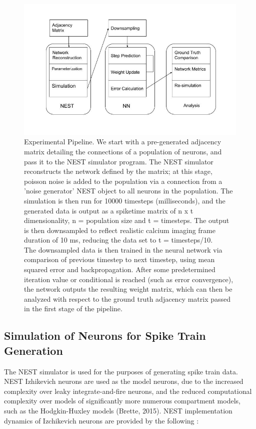\documentclass[11pt]{article}
\begin{document}
\begin{figure}[H]
\centering
	\includegraphics[scale=0.4]{./Figures/SPROJModel.jpg}
	\caption{Experimental Pipeline. We start with a pre-generated adjacency matrix detailing the connections of a population of neurons, and pass it to the NEST simulator program. The NEST simulator reconstructs the network defined by the matrix; at this stage, poisson noise is added to the population via a connection from a 'noise generator' NEST object to all neurons in the population. The simulation is then run for 10000 timesteps (milliseconds), and the generated data is output as a spiketime matrix of n x t dimensionality, n = population size and t = timesteps. The output is then downsampled to reflect realistic calcium imaging frame duration of 10 ms, reducing the data set to t = timesteps/10.\\
The downsampled data is then trained in the neural network via comparison of previous timestep to next timestep, using mean squared error and backpropagation. After some predetermined iteration value or conditional is reached (such as error convergence), the network outputs the resulting weight matrix, which can then be analyzed with respect to the ground truth adjacency matrix passed in the first stage of the pipeline.}
\end{figure}

\subsection{Simulation of Neurons for Spike Train Generation}
The NEST simulator is used for the purposes of generating spike train data. NEST Izhikevich neurons are used as the model neurons, due to the increased complexity over leaky integrate-and-fire neurons, and the reduced computational complexity over models of significantly more numerous compartment models, such as the Hodgkin-Huxley models (Brette, 2015). NEST implementation dynamics of Izchikevich neurons are provided by the following :
\end{document}
